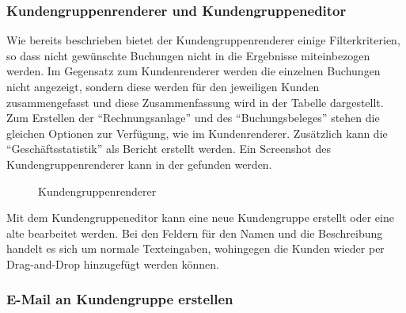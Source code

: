 \subsubsection{Kundengruppenrenderer und Kundengruppeneditor}
Wie bereits beschrieben bietet der Kundengruppenrenderer einige Filterkriterien, so dass nicht gewünschte Buchungen nicht in die Ergebnisse miteinbezogen werden.
Im Gegensatz zum Kundenrenderer werden die einzelnen Buchungen nicht angezeigt, sondern diese werden für den jeweiligen Kunden zusammengefasst und diese Zusammenfassung wird in der Tabelle dargestellt.
Zum Erstellen der \enquote{Rechnungsanlage} und des \enquote{Buchungsbeleges} stehen die gleichen Optionen zur Verfügung, wie im Kundenrenderer.
Zusätzlich kann die \enquote{Geschäftsstatistik} als Bericht erstellt werden.
Ein Screenshot des Kundengruppenrenderer kann in der  gefunden werden.
\begin{figure}[htb]
	\centering
	\caption{Kundengruppenrenderer}
	\label{fig:gui-kundengruppenrenderer}
\end{figure}

Mit dem Kundengruppeneditor kann eine neue Kundengruppe erstellt oder eine alte bearbeitet werden. Bei den Feldern für den Namen und die Beschreibung handelt es sich um normale Texteingaben, wohingegen die Kunden wieder per Drag-and-Drop hinzugefügt werden können.


\subsubsection{E-Mail an Kundengruppe erstellen}

